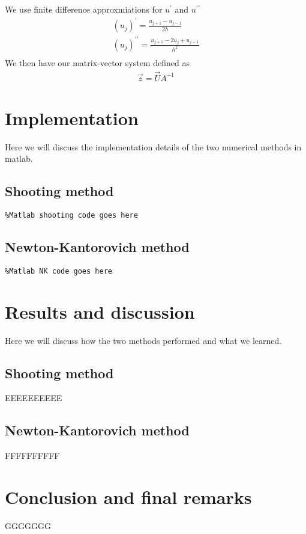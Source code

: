 \documentclass{article}
\begin{document}
\begin{enumerate}
We use finite difference approxmiations for $u^\prime$ and $u^{\prime\prime}$
\begin{align}
(u_j)^\prime = \frac{u_{j+1} - u_{j-1}}{2h} \\
(u_j)^{\prime\prime} = \frac{u_{j+1} - 2u_{j} + u_{j-1}}{h^2} \\
\end{align}
We then have our matrix-vector system defined as
\begin{align}
\vec{z} = \vec{U} A^{-1} 
\end{align}
\end{enumerate}
\section{Implementation}
Here we will discuss the implementation details of the two numerical methods in matlab. \\

\subsection{Shooting method}
\begin{lstlisting}
%Matlab shooting code goes here
\end{lstlisting}
\subsection{Newton-Kantorovich method}
\begin{lstlisting}
%Matlab NK code goes here
\end{lstlisting}
\section{Results and discussion}
Here we will discuss how the two methods performed and what we learned. 
\subsection{Shooting method}
EEEEEEEEEE
\subsection{Newton-Kantorovich method}
FFFFFFFFFF
\section{Conclusion and final remarks}
GGGGGGG
\end{document}

